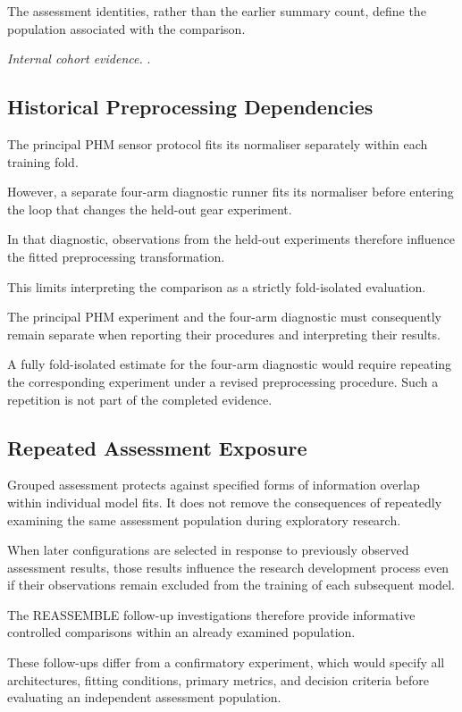 The assessment identities, rather than the earlier summary count, define the population associated with the comparison.

\noindent\textit{Internal cohort evidence.} .

\subsection{Historical Preprocessing Dependencies}

The principal PHM sensor protocol fits its normaliser separately within each training fold.

However, a separate four-arm diagnostic runner fits its normaliser before entering the loop that changes the held-out gear experiment.

In that diagnostic, observations from the held-out experiments therefore influence the fitted preprocessing transformation.

This limits interpreting the comparison as a strictly fold-isolated evaluation.

The principal PHM experiment and the four-arm diagnostic must consequently remain separate when reporting their procedures and interpreting their results.

A fully fold-isolated estimate for the four-arm diagnostic would require repeating the corresponding experiment under a revised preprocessing procedure. Such a repetition is not part of the completed evidence.

\subsection{Repeated Assessment Exposure}

Grouped assessment protects against specified forms of information overlap within individual model fits. It does not remove the consequences of repeatedly examining the same assessment population during exploratory research.

When later configurations are selected in response to previously observed assessment results, those results influence the research development process even if their observations remain excluded from the training of each subsequent model.

The REASSEMBLE follow-up investigations therefore provide informative controlled comparisons within an already examined population.

These follow-ups differ from a confirmatory experiment, which would specify all architectures, fitting conditions, primary metrics, and decision criteria before evaluating an independent assessment population.

